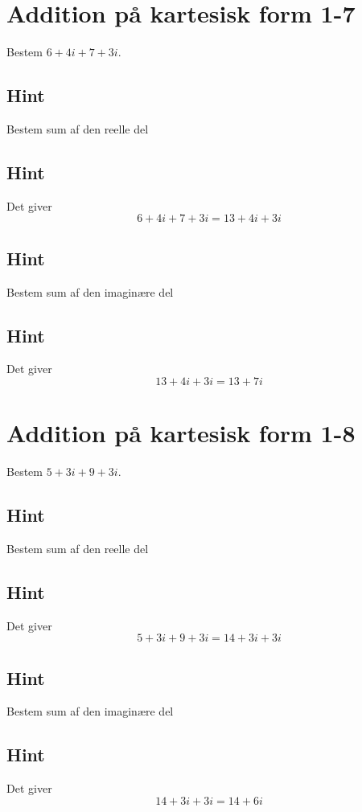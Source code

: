 \documentclass{article}
\newenvironment{exercise}[1]{\newpage\section{#1}}{}
\newcommand{\answerbox}[1]{\fbox{$#1$}}
\newcommand{\hint}{\subsection*{Hint}}
\begin{document}
\newpage

\begin{exercise}{Addition på kartesisk form 1-7}
	
	Bestem $6+4i+7+3i$.
	
	\answerbox{13  + 7i}
	
	\hint
	
	Bestem sum af den reelle del
	
	\hint
	
	Det giver
	\[
	6+4i+7+3i = 13 + 4i +3i
	\]
	
	\hint
	
	Bestem sum af den imaginære del 
	
	
	\hint
	
	Det giver 
	\[
	13 + 4i +3i = 13  + 7i
	\]
	
\end{exercise}

\newpage

\begin{exercise}{Addition på kartesisk form 1-8}
	
	Bestem $5+3i+9+3i$.
	
	\answerbox{14 + 6i}
	
	\hint
	
	Bestem sum af den reelle del
	
	\hint
	
	Det giver
	\[
	5+3i+9+3i = 14 + 3i + 3i
	\]
	
	\hint
	
	Bestem sum af den imaginære del 
	
	
	\hint
	
	Det giver 
	\[
	14 + 3i + 3i = 14 + 6i
	\]
	
\end{exercise}
\end{document}

